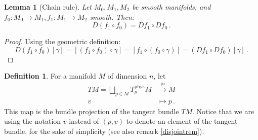\documentclass[a4paper,11pt,titlepage, article, oneside]{memoir}
\numberwithin{equation}{section}
\newtheorem{lemma}[theorem]{Lemma}
\theoremstyle{definition}
\newtheorem{definition}[theorem]{Definition}
\theoremstyle{remark}
\newcommand{\tangentphys}[1]{T_{#1}^{\text{phys}}}
\begin{document}
\begin{lemma}[Chain rule]
Let $M_0, M_1, M_2$ be smooth manifolds, and $f_0 \colon M_0 \rightarrow M_1, f_1 \colon M_1 \rightarrow M_2$ smooth. Then:
\[ D(f_1 \circ f_0) = Df_1 \circ Df_0 \, . \]
\end{lemma}
\begin{proof}
Using the geometric definition:
\begin{equation*}
D(f_1 \circ f_0)[\gamma] = [(f_1 \circ f_0) \circ \gamma] = [f_1 \circ (f_0 \circ \gamma)] = (Df_1 \circ Df_0)[\gamma] \, .
\end{equation*}
\end{proof}

\begin{definition}
For a manifold $M$ of dimension $n$, let
\begin{align}
TM = \bigsqcup_{p \in M} \tangentphys{p} M & \overset{\text{pr}}{\longrightarrow} M \\
v &\longmapsto p \, . \nonumber
\end{align}
This map is the bundle projection of the tangent bundle $TM$. Notice that we are using the notation $v$ instead of $(p, v)$ to denote an element of the tangent bundle, for the sake of simplicity (see also remark \ref{disjointrem}).
\end{definition}
\end{document}
